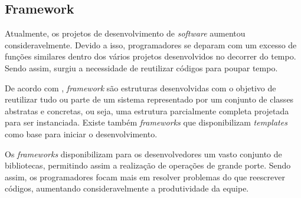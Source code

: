 \subsection{\bf Framework}

Atualmente, os projetos de desenvolvimento de \textit{software} aumentou consideravelmente. Devido a isso, programadores se deparam com um excesso de funções similares dentro dos vários projetos desenvolvidos no decorrer do tempo. Sendo assim, surgiu a necessidade de reutilizar códigos para poupar tempo. 

De acordo com , \textit{framework} são estruturas desenvolvidas com o objetivo de reutilizar tudo ou parte de um sistema representado por um conjunto de classes abstratas e concretas, ou seja,  uma estrutura parcialmente completa projetada para ser instanciada. Existe também \textit{frameworks}  que disponibilizam \textit{templates} como base para iniciar o desenvolvimento.

Os \textit{frameworks} disponibilizam para os desenvolvedores um vasto conjunto de bibliotecas, permitindo assim a realização de operações de grande porte. Sendo assim, os programadores focam mais em resolver problemas do que reescrever códigos, aumentando consideravelmente a produtividade da equipe. 